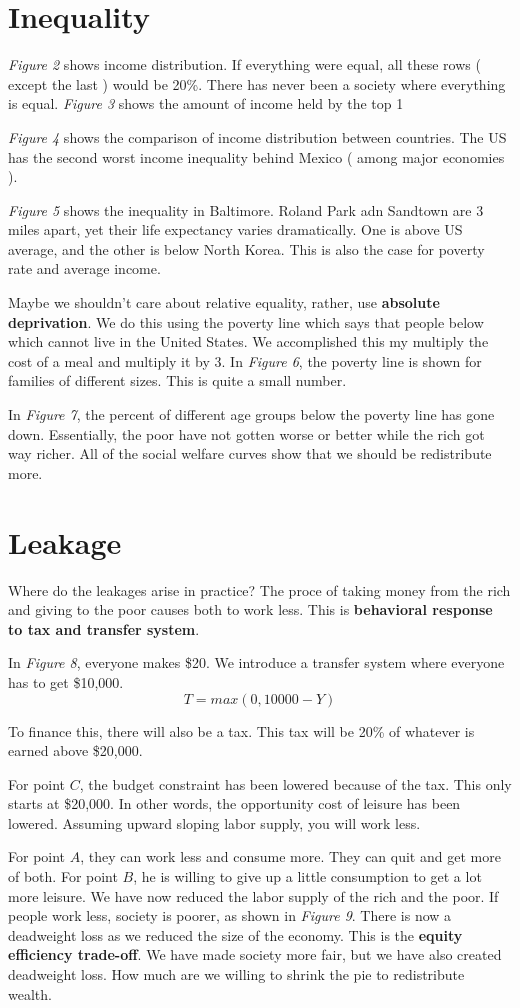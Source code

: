 \documentclass{article}
\begin{document}
\section{ Inequality }

\textit{Figure 2} shows income distribution. If everything were equal, all these
rows ( except the last ) would be 20\%. There has never been a society where
everything is equal. \textit{Figure 3} shows the amount of income held by the
top 1%

\textit{Figure 4} shows the comparison of income distribution between countries.
The US has the second worst income inequality behind Mexico ( among major
economies ). 

\textit{Figure 5} shows the inequality in Baltimore. Roland Park adn Sandtown
are 3 miles apart, yet their life expectancy varies dramatically. One is above
US average, and the other is below North Korea. This is also the case for
poverty rate and average income. 

Maybe we shouldn't care about relative equality, rather, use \textbf{absolute
deprivation}. We do this using the poverty line which says that people below
which cannot live in the United States. We accomplished this my multiply the
cost of a meal and multiply it by 3. In \textit{Figure 6}, the poverty line is
shown for families of different sizes. This is quite a small number.

In \textit{Figure 7}, the percent of different age groups below the poverty line
has gone down. Essentially, the poor have not gotten worse or better while the
rich got way richer. All of the social welfare curves show that we should be
redistribute more.

\section{ Leakage }

Where do the leakages arise in practice? The proce of taking money from the
rich and giving to the poor causes both to work less. This is \textbf{behavioral
response to tax and transfer system}.

In \textit{Figure 8}, everyone makes \$20. We introduce a transfer system where
everyone has to get \$10,000. 
$$ T = max( 0, 10000 - Y ) $$

To finance this, there will also be a tax. This tax will be 20\% of whatever is
earned above \$20,000. 

For point $C$, the budget constraint has been lowered because of the tax. This
only starts at \$20,000. In other words, the opportunity cost of leisure has
been lowered. Assuming upward sloping labor supply, you will work less.

For point $A$, they can work less and consume more. They can quit and get more
of both. For point $B$, he is willing to give up a little consumption to get a
lot more leisure. We have now reduced the labor supply of the rich and the poor.
If people work less, society is poorer, as shown in \textit{Figure 9}. There is
now a deadweight loss as we reduced the size of the economy. This is the
\textbf{equity efficiency trade-off}. We have made society more fair, but we
have also created deadweight loss. How much are we willing to shrink the pie to
redistribute wealth. 
\end{document}

